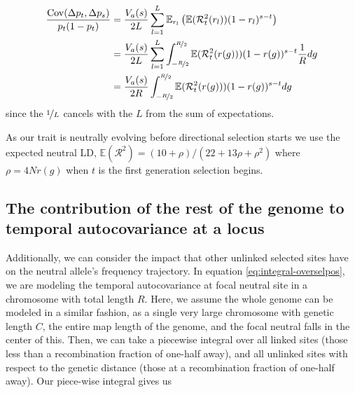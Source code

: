 \documentclass[11pt]{article}
\newcommand{\E}{\mathbb{E}}
\DeclareMathOperator{\cov}{Cov}
\begin{document}
\begin{subequations}
  \begin{align}
    \frac{\cov(\Delta p_t, \Delta p_s)}{p_t(1-p_t) } &= \frac{V_a(s)}{2L} \sum_{l=1}^L \E_{r_l} \left( \E(\mathcal{R}_{t}^2(r_l)) (1-r_l)^{s-t} \right) \label{eq:cont-approx-step-1} \\
                                                     &= \frac{V_a(s)}{2L} \sum_{l=1}^L \int_{-\nicefrac{R}{2}}^{\nicefrac{R}{2}} \E(\mathcal{R}^2_{t}(r(g))) (1-r(g))^{s-t} \frac{1}{R} d g \label{eq:exp-overselpos} \\
                                                     &= \frac{V_a(s)}{2R} \int_{-\nicefrac{R}{2}}^{\nicefrac{R}{2}} \E(\mathcal{R}^2_{t}(r(g))) (1-r(g))^{s-t} d g \label{eq:integral-overselpos}
  \end{align}
\end{subequations}
%
since the $\nicefrac{1}{L}$ cancels with the $L$ from the sum of expectations.

As our trait is neutrally evolving before directional selection starts we use
the expected neutral LD, $\E(\mathcal{R}^2) = (10 + \rho)/(22 + 13 \rho +
\rho^2)$ where $\rho = 4Nr(g)$ \parencite{Ohta1969-ae,Hill1968-ue} when $t$ is
the first generation selection begins. 

\subsection{The contribution of the rest of the genome to temporal autocovariance at a locus}
\label{ap:unlinked-contribution}

Additionally, we can consider the impact that other unlinked selected sites
have on the neutral allele's frequency trajectory. In equation
\eqref{eq:integral-overselpos}, we are modeling the temporal autocovariance
at focal neutral site in a chromosome with total length $R$. Here, we assume
the whole genome can be modeled in a similar fashion, as a single very large
chromosome with genetic length $C$, the entire map length of the genome, and
the focal neutral falls in the center of this. Then, we can take a piecewise
integral over all linked sites (those less than a recombination fraction of
one-half away), and all unlinked sites with respect to the genetic distance
(those at a recombination fraction of one-half away). Our piece-wise integral
gives us
\end{document}
